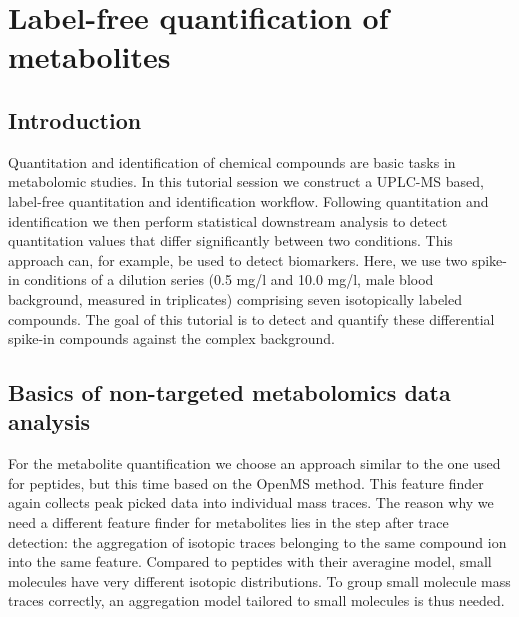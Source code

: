 
\newpage
\section{Label-free quantification of metabolites}

\subsection{Introduction}
Quantitation and identification of chemical compounds are basic tasks in metabolomic studies. In this tutorial session we construct a UPLC-MS based, label-free quantitation and identification workflow. Following quantitation and identification we then perform statistical downstream analysis to detect quantitation values that differ significantly between two conditions. This approach can, for example, be used to detect biomarkers. Here, we use two spike-in conditions of a dilution series (0.5 mg/l and 10.0 mg/l, male blood background, measured in triplicates) comprising seven isotopically labeled compounds. The goal of this tutorial is to detect and quantify these differential spike-in compounds against the complex background.


\subsection{Basics of non-targeted metabolomics data analysis}

For the metabolite quantification we choose an approach similar to the one used for peptides, but this time based on the OpenMS  method. This feature finder again collects peak picked data into individual mass traces. The reason why we need a different feature finder for metabolites lies in the step after trace detection: the aggregation of isotopic traces belonging to the same compound ion into the same feature. Compared to peptides with their averagine model, small molecules have very different isotopic distributions. To group small molecule mass traces correctly, an aggregation model tailored to small molecules is thus needed. 

